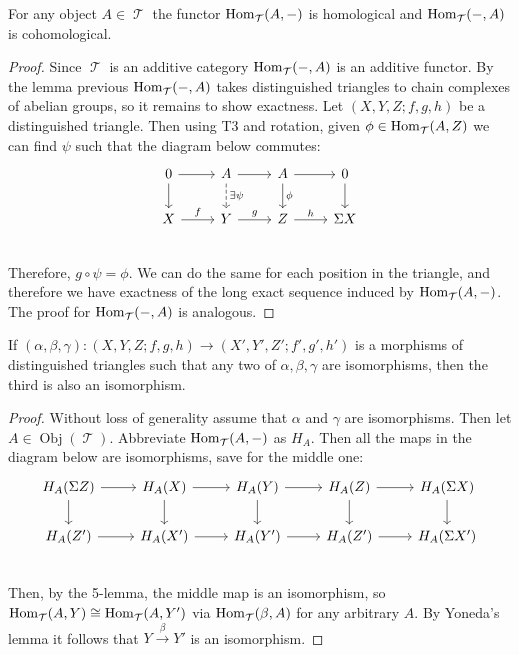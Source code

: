 \documentclass[11pt]{article}
\DeclareMathOperator{\ob}{Obj}
\DeclareMathOperator{\TT}{\mathcal{T}}
\begin{document}
\begin{prop}
For any object $A \in \TT$ the functor $\Hom_{\TT}(A,-)$ is homological and $\Hom_{\TT}(-,A)$ is cohomological.
\end{prop}
\begin{proof}
Since $\TT$ is an additive category $\Hom_{\TT}(-,A)$ is an additive functor. By the lemma previous $\Hom_{\TT}(-,A)$ takes distinguished triangles to chain complexes of abelian groups, so it remains to show exactness. Let $(X,Y,Z; f,g,h)$ be a distinguished triangle. Then using T3 and rotation, given $\phi \in \Hom_{\TT}(A,Z)$ we can find $\psi$ such that the diagram below commutes:
\[\begin{tikzcd}
0 \ar[r] \ar[d] & A \ar[r] \ar[d,dashed,"\exists \psi"] & A \ar[d,"\phi"] \ar[r] & 0 \ar[d]\\
X \ar[r,"f"] & Y \ar[r,"g"] & Z \ar[r,"h"] & \Sigma X\\
\end{tikzcd}\]
Therefore, $g\circ\psi = \phi$. We can do the same for each position in the triangle, and therefore we have exactness of the long exact sequence induced by $\Hom_{\TT}(A,-)$. The proof for $\Hom_{\TT}(-,A)$ is analogous.
\end{proof}
\begin{prop}\label{tri-five}
If $(\alpha,\beta,\gamma):(X,Y,Z; f,g,h) \to (X',Y',Z'; f',g',h')$ is a morphisms of distinguished triangles such that any two of $\alpha,\beta,\gamma$ are isomorphisms, then the third is also an isomorphism.
\end{prop}
\begin{proof}
Without loss of generality assume that $\alpha$ and $\gamma$ are isomorphisms. Then let $A \in \ob(\TT)$. Abbreviate $\Hom_{\TT}(A,-)$ as $H_A$. Then all the maps in the diagram below are isomorphisms, save for the middle one:
\[\begin{tikzcd}
	H_A(\Sigma Z) \ar[r] \ar[d] & H_A(X) \ar[r] \ar[d] & H_A(Y) \ar[d] \ar[r] & H_A(Z) \ar[d] \ar[r]& H_A(\Sigma X) \ar[d]\\
	H_A(Z') \ar[r] & H_A(X') \ar[r] & H_A(Y') \ar[r] & H_A(Z') \ar[r]& H_A(\Sigma X')  \\
\end{tikzcd}\]
Then, by the 5-lemma, the middle map is an isomorphism, so $\Hom_{\TT}(A,Y) \cong \Hom_{\TT}(A,Y')$ via $\Hom_{\TT}(\beta, A)$ for any arbitrary $A$. By Yoneda's lemma it follows that $Y \xrightarrow{\beta} Y'$ is an isomorphism.
\end{proof}
\end{document}
